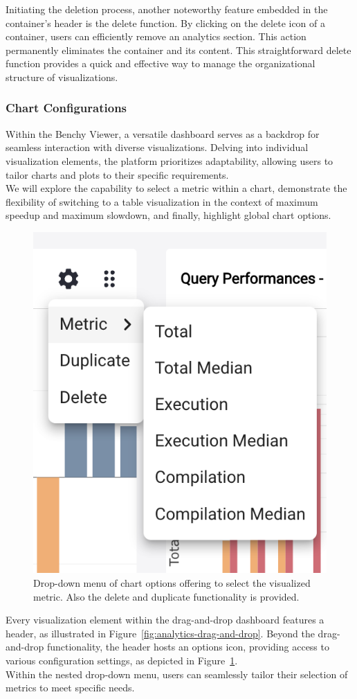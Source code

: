 Initiating the deletion process, another noteworthy feature embedded in the container's header is the delete function. By clicking on the delete icon of a container, users can efficiently remove an analytics section. This action permanently eliminates the container and its content. This straightforward delete function provides a quick and effective way to manage the organizational structure of visualizations.


\subsubsection{Chart Configurations}\label{sec:chart-configuration}

Within the Benchy Viewer, a versatile dashboard serves as a backdrop for seamless interaction with diverse visualizations. Delving into individual visualization elements, the platform prioritizes adaptability, allowing users to tailor charts and plots to their specific requirements.\\
We will explore the capability to select a metric within a chart, demonstrate the flexibility of switching to a table visualization in the context of maximum speedup and maximum slowdown, and finally, highlight global chart options.

\begin{figure}[h]
  \centering
  \includegraphics[width=0.35\linewidth]{figures/chart-configuration.png}
  \caption{Drop-down menu of chart options offering to select the visualized metric. Also the delete and duplicate functionality is provided.}
  \label{fig:chart-configuration}
\end{figure}

Every visualization element within the drag-and-drop dashboard features a header, as illustrated in Figure~\ref{fig:analytics-drag-and-drop}. Beyond the drag-and-drop functionality, the header hosts an options icon, providing access to various configuration settings, as depicted in Figure~\ref{fig:chart-configuration}.\\
Within the nested drop-down menu, users can seamlessly tailor their selection of metrics to meet specific needs.

